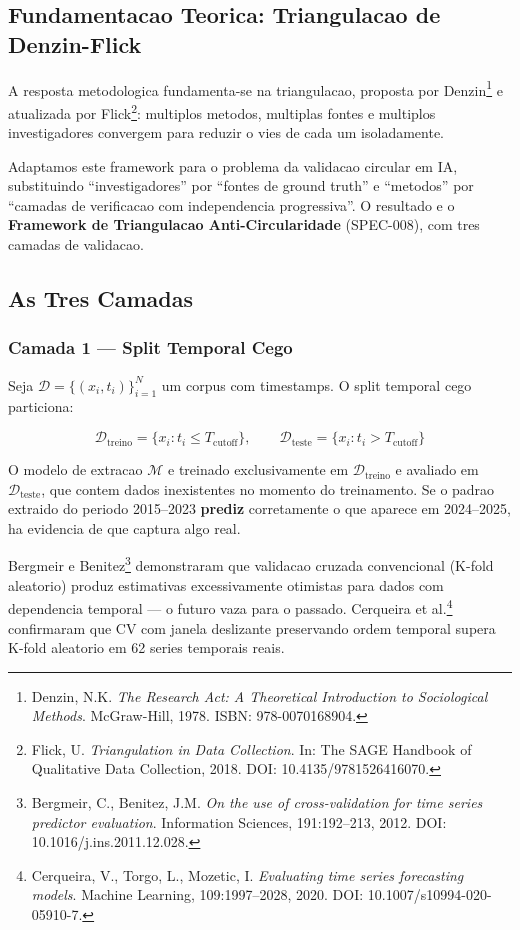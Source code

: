 \subsection{Fundamentacao Teorica: Triangulacao de Denzin-Flick}

A resposta metodologica fundamenta-se na triangulacao, proposta por
Denzin\footnote{Denzin, N.K. \textit{The Research Act: A Theoretical
Introduction to Sociological Methods}. McGraw-Hill, 1978. ISBN: 978-0070168904.}
e atualizada por Flick\footnote{Flick, U. \textit{Triangulation in Data
Collection}. In: The SAGE Handbook of Qualitative Data Collection, 2018. DOI:
10.4135/9781526416070.}: multiplos metodos, multiplas fontes e multiplos
investigadores convergem para reduzir o vies de cada um isoladamente.

Adaptamos este framework para o problema da validacao circular em IA,
substituindo ``investigadores'' por ``fontes de ground truth'' e ``metodos''
por ``camadas de verificacao com independencia progressiva''. O resultado e o
\textbf{Framework de Triangulacao Anti-Circularidade} (SPEC-008), com tres
camadas de validacao.

\subsection{As Tres Camadas}

\subsubsection{Camada 1 — Split Temporal Cego}

Seja $\mathcal{D} = \{(x_i, t_i)\}_{i=1}^{N}$ um corpus com timestamps. O
split temporal cego particiona:

\begin{equation}
\mathcal{D}_{\text{treino}} = \{x_i : t_i \leq T_{\text{cutoff}}\}, \qquad
\mathcal{D}_{\text{teste}} = \{x_i : t_i > T_{\text{cutoff}}\}
\end{equation}

O modelo de extracao $\mathcal{M}$ e treinado exclusivamente em
$\mathcal{D}_{\text{treino}}$ e avaliado em $\mathcal{D}_{\text{teste}}$, que
contem dados inexistentes no momento do treinamento. Se o padrao extraido do
periodo 2015--2023 \textbf{prediz} corretamente o que aparece em 2024--2025,
ha evidencia de que captura algo real.

Bergmeir e Benitez\footnote{Bergmeir, C., Benitez, J.M. \textit{On the use of
cross-validation for time series predictor evaluation}. Information Sciences,
191:192--213, 2012. DOI: 10.1016/j.ins.2011.12.028.} demonstraram que validacao
cruzada convencional (K-fold aleatorio) produz estimativas excessivamente
otimistas para dados com dependencia temporal — o futuro vaza para o passado.
Cerqueira et al.\footnote{Cerqueira, V., Torgo, L., Mozetic, I. \textit{Evaluating
time series forecasting models}. Machine Learning, 109:1997--2028, 2020. DOI:
10.1007/s10994-020-05910-7.} confirmaram que CV com janela deslizante
preservando ordem temporal supera K-fold aleatorio em 62 series temporais reais.

